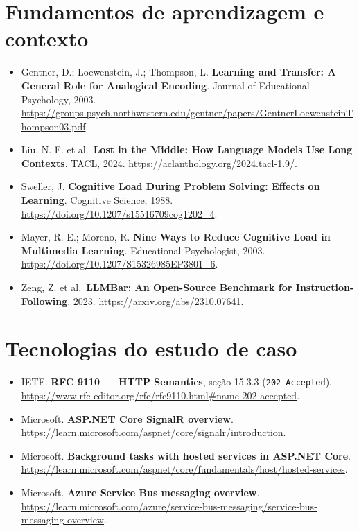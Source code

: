 \documentclass[
  10pt,
  a4paper,
  oneside]{book}
\providecommand{\tightlist}{%
  \setlength{\itemsep}{0pt}\setlength{\parskip}{0pt}}
\begin{document}
\hypertarget{fundamentos-de-aprendizagem-e-contexto}{%
\section{Fundamentos de aprendizagem e
contexto}\label{fundamentos-de-aprendizagem-e-contexto}}

\begin{itemize}
\tightlist
\item
  Gentner, D.; Loewenstein, J.; Thompson, L. \textbf{Learning and
  Transfer: A General Role for Analogical Encoding}. Journal of
  Educational Psychology, 2003.
  \url{https://groups.psych.northwestern.edu/gentner/papers/GentnerLoewensteinThompson03.pdf}.
\item
  Liu, N. F. et al.~\textbf{Lost in the Middle: How Language Models Use
  Long Contexts}. TACL, 2024.
  \url{https://aclanthology.org/2024.tacl-1.9/}.
\item
  Sweller, J. \textbf{Cognitive Load During Problem Solving: Effects on
  Learning}. Cognitive Science, 1988.
  \url{https://doi.org/10.1207/s15516709cog1202_4}.
\item
  Mayer, R. E.; Moreno, R. \textbf{Nine Ways to Reduce Cognitive Load in
  Multimedia Learning}. Educational Psychologist, 2003.
  \url{https://doi.org/10.1207/S15326985EP3801_6}.
\item
  Zeng, Z. et al.~\textbf{LLMBar: An Open-Source Benchmark for
  Instruction-Following}. 2023. \url{https://arxiv.org/abs/2310.07641}.
\end{itemize}

\hypertarget{tecnologias-do-estudo-de-caso}{%
\section{Tecnologias do estudo de
caso}\label{tecnologias-do-estudo-de-caso}}

\begin{itemize}
\item
  IETF. \textbf{RFC 9110 --- HTTP Semantics}, seção 15.3.3
  (\texttt{202\ Accepted}).
  \url{https://www.rfc-editor.org/rfc/rfc9110.html\#name-202-accepted}.
\item
  Microsoft. \textbf{ASP.NET Core SignalR overview}.
  \url{https://learn.microsoft.com/aspnet/core/signalr/introduction}.
\item
  Microsoft. \textbf{Background tasks with hosted services in ASP.NET
  Core}.
  \url{https://learn.microsoft.com/aspnet/core/fundamentals/host/hosted-services}.
\item
  Microsoft. \textbf{Azure Service Bus messaging overview}.
  \url{https://learn.microsoft.com/azure/service-bus-messaging/service-bus-messaging-overview}.
\end{itemize}
\end{document}

